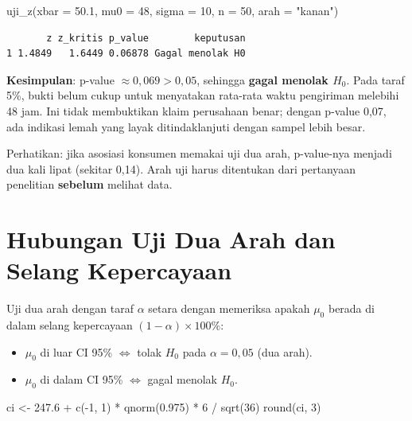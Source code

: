 \documentclass[
  indonesian,
  letterpaper,
]{book}
\newenvironment{Shaded}{\begin{snugshade}}{\end{snugshade}}
\newcommand{\AttributeTok}[1]{\textcolor[rgb]{0.40,0.45,0.13}{#1}}
\newcommand{\DecValTok}[1]{\textcolor[rgb]{0.68,0.00,0.00}{#1}}
\newcommand{\FloatTok}[1]{\textcolor[rgb]{0.68,0.00,0.00}{#1}}
\newcommand{\FunctionTok}[1]{\textcolor[rgb]{0.28,0.35,0.67}{#1}}
\newcommand{\NormalTok}[1]{\textcolor[rgb]{0.00,0.23,0.31}{#1}}
\newcommand{\OtherTok}[1]{\textcolor[rgb]{0.00,0.23,0.31}{#1}}
\newcommand{\SpecialCharTok}[1]{\textcolor[rgb]{0.37,0.37,0.37}{#1}}
\newcommand{\StringTok}[1]{\textcolor[rgb]{0.13,0.47,0.30}{#1}}
\providecommand{\tightlist}{%
  \setlength{\itemsep}{0pt}\setlength{\parskip}{0pt}}
\begin{document}
\begin{Shaded}
\begin{Highlighting}[]
\FunctionTok{uji\_z}\NormalTok{(}\AttributeTok{xbar =} \FloatTok{50.1}\NormalTok{, }\AttributeTok{mu0 =} \DecValTok{48}\NormalTok{, }\AttributeTok{sigma =} \DecValTok{10}\NormalTok{, }\AttributeTok{n =} \DecValTok{50}\NormalTok{, }\AttributeTok{arah =} \StringTok{"kanan"}\NormalTok{)}
\end{Highlighting}
\end{Shaded}

\begin{verbatim}
       z z_kritis p_value        keputusan
1 1.4849   1.6449 0.06878 Gagal menolak H0
\end{verbatim}

\textbf{Kesimpulan}: p-value \(\approx 0{,}069 > 0{,}05\), sehingga
\textbf{gagal menolak \(H_0\)}. Pada taraf 5\%, bukti belum cukup untuk
menyatakan rata-rata waktu pengiriman melebihi 48 jam. Ini tidak
membuktikan klaim perusahaan benar; dengan p-value 0,07, ada indikasi
lemah yang layak ditindaklanjuti dengan sampel lebih besar.

Perhatikan: jika asosiasi konsumen memakai uji dua arah, p-value-nya
menjadi dua kali lipat (sekitar 0,14). Arah uji harus ditentukan dari
pertanyaan penelitian \textbf{sebelum} melihat data.

\section{Hubungan Uji Dua Arah dan Selang
Kepercayaan}\label{hubungan-uji-dua-arah-dan-selang-kepercayaan}

Uji dua arah dengan taraf \(\alpha\) setara dengan memeriksa apakah
\(\mu_0\) berada di dalam selang kepercayaan
\((1-\alpha) \times 100\%\):

\begin{itemize}
\tightlist
\item
  \(\mu_0\) di luar CI 95\% \(\Longleftrightarrow\) tolak \(H_0\) pada
  \(\alpha = 0{,}05\) (dua arah).
\item
  \(\mu_0\) di dalam CI 95\% \(\Longleftrightarrow\) gagal menolak
  \(H_0\).
\end{itemize}

\begin{Shaded}
\begin{Highlighting}[]
\NormalTok{ci }\OtherTok{\textless{}{-}} \FloatTok{247.6} \SpecialCharTok{+} \FunctionTok{c}\NormalTok{(}\SpecialCharTok{{-}}\DecValTok{1}\NormalTok{, }\DecValTok{1}\NormalTok{) }\SpecialCharTok{*} \FunctionTok{qnorm}\NormalTok{(}\FloatTok{0.975}\NormalTok{) }\SpecialCharTok{*} \DecValTok{6} \SpecialCharTok{/} \FunctionTok{sqrt}\NormalTok{(}\DecValTok{36}\NormalTok{)}
\FunctionTok{round}\NormalTok{(ci, }\DecValTok{3}\NormalTok{)}
\end{Highlighting}
\end{Shaded}
\end{document}
